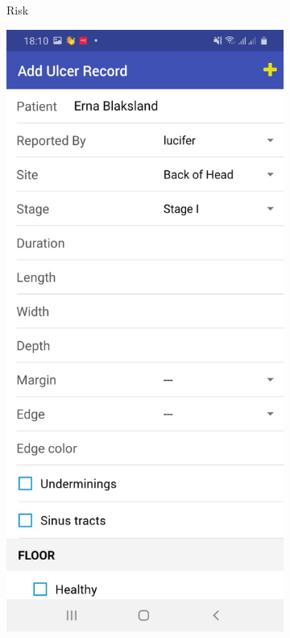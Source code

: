 \begin{figure}
\begin{subfigure}[b]{0.125\textwidth}
        \caption{Risk}
        \label{fig:risk}
    \end{subfigure}
    \hfill %
    \begin{subfigure}[b]{0.125\textwidth}
        \includegraphics[width=\textwidth]{figs/mobapp/img4.jpeg}

\end{subfigure}
\end{figure}
